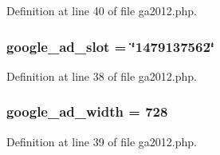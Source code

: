Definition at line 40 of file ga2012.\-php.

\hypertarget{ga2012_8php_aa79c0b4edf93d8b30e366517f0be9a76}{
\subsubsection[{google\-\_\-ad\-\_\-slot}]{\setlength{\rightskip}{0pt plus 5cm}google\-\_\-ad\-\_\-slot = \char`\"{}1479137562\char`\"{}}}\label{ga2012_8php_aa79c0b4edf93d8b30e366517f0be9a76}


Definition at line 38 of file ga2012.\-php.

\hypertarget{ga2012_8php_a0306e559cf8f0ad70404137191e0dbf1}{
\subsubsection[{google\-\_\-ad\-\_\-width}]{\setlength{\rightskip}{0pt plus 5cm}google\-\_\-ad\-\_\-width = 728}}\label{ga2012_8php_a0306e559cf8f0ad70404137191e0dbf1}


Definition at line 39 of file ga2012.\-php.

